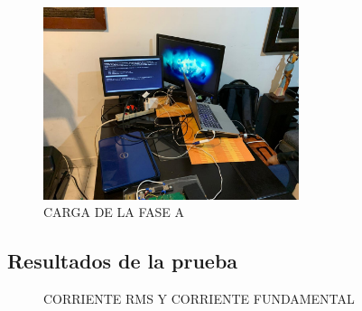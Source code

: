     \begin{figure}[H]
      \begin{center}
          \includegraphics[width = 7.5cm]{4Resultados/cargas.jpeg}
          \caption{ CARGA DE LA FASE A} 
          \label{fig:cargaA}
     \end{center}
    \end{figure}
    \subsection{Resultados de la prueba}
    \begin{figure}[H]
      \hfill
      \hfill
      \hfill
      \caption{CORRIENTE RMS Y CORRIENTE FUNDAMENTAL}
      \end{figure}

